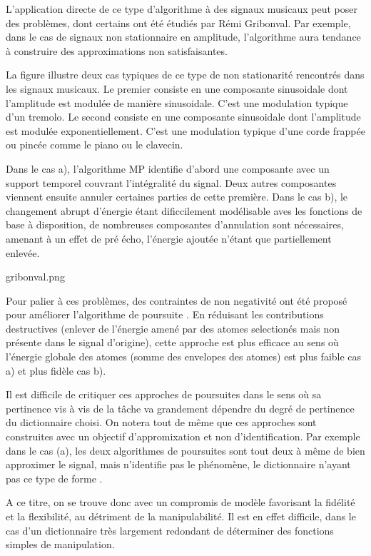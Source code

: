 L'application directe de ce type d'algorithme à des signaux musicaux peut poser des problèmes, dont certains ont été étudiés par Rémi Gribonval. Par exemple, dans le cas de signaux non stationnaire en amplitude, l'algorithme aura tendance à construire des approximations non satisfaisantes.

La figure illustre deux cas typiques de ce type de non stationarité rencontrés dans les signaux musicaux. Le premier consiste en une composante sinusoidale dont l'amplitude est modulée de manière sinusoidale. C'est une modulation typique d'un tremolo. Le second consiste en une composante sinusoidale dont l'amplitude est modulée exponentiellement. C'est une modulation typique d'une corde frappée ou pincée comme le piano ou le clavecin.

Dans le cas a), l'algorithme MP identifie d'abord une composante avec un support temporel couvrant l'intégralité du signal. Deux autres composantes viennent ensuite annuler certaines parties de cette première. Dans le cas b), le changement abrupt d'énergie étant dificcilement modélisable aves les fonctions de base à disposition, de nombreuses composantes d'annulation sont nécessaires, amenant à un effet de pré écho, l'énergie ajoutée n'étant que partiellement enlevée.

gribonval.png

Pour palier à ces problèmes, des contraintes de non negativité ont été proposé pour améliorer l'algorithme de poursuite \cite{gribonval1996sound}. En réduisant les contributions destructives (enlever de l'énergie amené par des atomes selectionés mais non présente dans le signal d'origine), cette approche est plus efficace au sens où l'énergie globale des atomes (somme des envelopes des atomes) est plus faible cas a)  et plus fidèle cas b).

Il est difficile de critiquer ces approches de poursuites dans le sens où sa pertinence vis à vis de la tâche va grandement dépendre du degré de pertinence du dictionnaire choisi. On notera tout de même que ces approches sont construites avec un objectif d'appromixation et non d'identification. Par exemple dans le cas (a), les deux algorithmes de poursuites sont tout deux à même de bien approximer le signal, mais \og n'identifie \fg pas le phénomène, le dictionnaire n'ayant pas ce type de forme .

A ce titre, on se trouve donc avec un compromis de modèle favorisant la fidélité et la flexibilité, au détriment de la manipulabilité. Il est en effet difficile, dans le cas d'un dictionnaire très largement redondant de déterminer des fonctions simples de manipulation.

